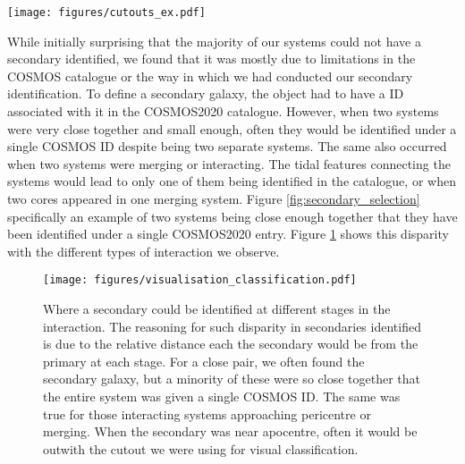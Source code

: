 \documentclass[fleqn,usenatbib]{mnras}
\begin{document}
\begin{figure*}
    \centering
    \texttt{[image: figures/cutouts\_ex.pdf]}
    \caption{An example of each visual classification made on the cross matched sample. From left to right these are the secondary could not be identified, the primary had a clear secondary, the primary could not be reliably classified as an interacting galaxy, the redshift was null and the incorrect primary was identified in OR+23. Based on these classifications, we either add the secondary galaxies to the sample or we remove the contamination from it. These images are 30" across using the COSMOS cutout service, selecting HST/ACS tiles as the basis for the observations in the $F814W$ filter.}
    \label{fig:secondary_selection}
\end{figure*}

While initially surprising that the majority of our systems could not have a secondary identified, we found that it was mostly due to limitations in the COSMOS catalogue or the way in which we had conducted our secondary identification. To define a secondary galaxy, the object had to have a ID associated with it in the COSMOS2020 catalogue. However, when two systems were very close together and small enough, often they would be identified under a single COSMOS ID despite being two separate systems. The same also occurred when two systems were merging or interacting. The tidal features connecting the systems would lead to only one of them being identified in the catalogue, or when two cores appeared in one merging system. Figure \ref{fig:secondary_selection} specifically an example of two systems being close enough together that they have been identified under a single COSMOS2020 entry. Figure \ref{fig:secondaries_found} shows this disparity with the different types of interaction we observe.

\begin{figure}
    \centering
    \texttt{[image: figures/visualisation\_classification.pdf]}
    \caption{Where a secondary could be identified at different stages in the interaction. The reasoning for such disparity in secondaries identified is due to the relative distance each the secondary would be from the primary at each stage. For a close pair, we often found the secondary galaxy, but a minority of these were so close together that the entire system was given a single COSMOS ID. The same was true for those interacting systems approaching pericentre or merging. When the secondary was near apocentre, often it would be outwith the cutout we were using for visual classification.}
    \label{fig:secondaries_found}
\end{figure}
\end{document}
